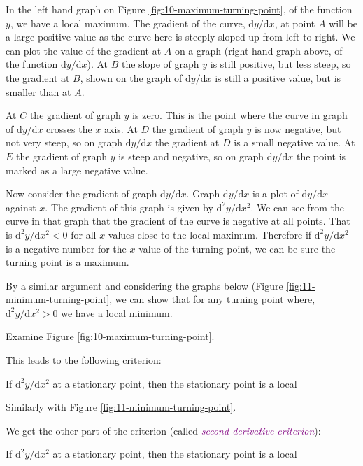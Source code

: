 \documentclass[
  english,
  11pt,
  oneside]{book}
\newcommand{\slide}{}
\theoremstyle{definition}
\theoremstyle{definition}
\theoremstyle{definition}
\theoremstyle{definition}
\theoremstyle{remark}
\begin{document}
\begin{notslides}

In the left hand graph on Figure \ref{fig:10-maximum-turning-point}, of the function \(y\), we have a local maximum. The gradient of the curve, \(\mathrm{d}y/\mathrm{d} x\), at point \(A\) will be a large positive value as the curve here is steeply sloped up from left to right. We can plot the value of the gradient at \(A\) on a graph (right hand graph above, of the function \(\mathrm{d}y/\mathrm{d} x\)). At \(B\) the slope of graph \(y\) is still positive, but less steep, so the gradient at \(B\), shown on the graph of \(\mathrm{d}y/\mathrm{d} x\) is still a positive value, but is smaller than at \(A\).

At \(C\) the gradient of graph \(y\) is zero. This is the point where the curve in graph of \(\mathrm{d}y/\mathrm{d} x\) crosses the \(x\) axis. At \(D\) the gradient of graph \(y\) is now negative, but not very steep, so on graph \(\mathrm{d}y/\mathrm{d} x\) the gradient at \(D\) is a small negative value. At \(E\) the gradient of graph \(y\) is steep and negative, so on graph \(\mathrm{d}y/\mathrm{d} x\) the point is marked as a large negative value.

Now consider the gradient of graph \(\mathrm{d}y/\mathrm{d} x\). Graph \(\mathrm{d}y/\mathrm{d} x\) is a plot of \(\mathrm{d}y/\mathrm{d} x\) against \(x\). The gradient of this graph is given by \(\mathrm{d}^{2}y/\mathrm{d} x^2\). We can see from the curve in that graph that the gradient of the curve is negative at all points. That is \(\mathrm{d}^{2}y/\mathrm{d} x^2<0\) for all \(x\) values close to the local maximum. Therefore if \(\mathrm{d}^{2}y/\mathrm{d} x^2\) is a negative number for the \(x\) value of the turning point, we can be sure the turning point is a maximum.
\slide

By a similar argument and considering the graphs below (Figure \ref{fig:11-minimum-turning-point}, we can show that for any turning point where, \(\mathrm{d}^{2}y/\mathrm{d} x^2>0\) we have a local minimum.

\end{notslides}

\begin{slidesonly}

Examine Figure \ref{fig:10-maximum-turning-point}.

\vfill

This leads to the following criterion:

If \(\mathrm{d}^{2}y/\mathrm{d} x^2\) \phantom{aaaaaaa} at a stationary point, then the stationary point is a local

\slide

Similarly with Figure \ref{fig:11-minimum-turning-point}.

\vfill

We get the other part of the criterion (called \textcolor{purple}{\em second derivative criterion}):

If \(\mathrm{d}^{2}y/\mathrm{d} x^2\) \phantom{aaaaaaa} at a stationary point, then the stationary point is a local

\end{slidesonly}
\end{document}
